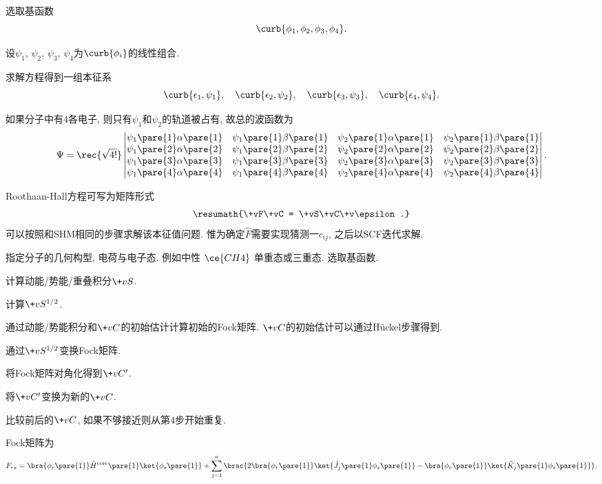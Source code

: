 \documentclass[hidelinks]{ctexart}
\begin{document}
\begin{cenum}
    \item 选取基函数
    \[ \curb{\phi_1,\phi_2,\phi_3,\phi_4}. \]
    \item 设$\psi_1$, $\psi_2$, $\psi_3$, $\psi_4$为$\curb{\phi_i}$的线性组合.
    \item 求解方程得到一组本征系
    \[ \curb{\epsilon_1,\psi_1},\quad \curb{\epsilon_2,\psi_2},\quad \curb{\epsilon_3,\psi_3},\quad \curb{\epsilon_4,\psi_4}. \]
    \item 如果分子中有$4$各电子, 则只有$\psi_1$和$\psi_2$的轨道被占有, 故总的波函数为
    \[ \Psi = \rec{\sqrt{4!}} \begin{vmatrix}
    \psi_1\pare{1}\alpha\pare{1} & \psi_1\pare{1}\beta\pare{1} & \psi_2\pare{1}\alpha\pare{1} & \psi_2\pare{1}\beta\pare{1} \\
    \psi_1\pare{2}\alpha\pare{2} & \psi_1\pare{2}\beta\pare{2} & \psi_2\pare{2}\alpha\pare{2} & \psi_2\pare{2}\beta\pare{2} \\
    \psi_1\pare{3}\alpha\pare{3} & \psi_1\pare{3}\beta\pare{3} & \psi_2\pare{3}\alpha\pare{3} & \psi_2\pare{3}\beta\pare{3} \\
    \psi_1\pare{4}\alpha\pare{4} & \psi_1\pare{4}\beta\pare{4} & \psi_2\pare{4}\alpha\pare{4} & \psi_2\pare{4}\beta\pare{4}
\end{vmatrix}. \]
\end{cenum}
Roothaan-Hall方程可写为矩阵形式
\[ \resumath{\+vF\+vC = \+vS\+vC\+v\epsilon.} \]
可以按照和SHM相同的步骤求解该本征值问题. 惟为确定$\hat F$需要实现猜测一$c_{ij}$, 之后以SCF迭代求解.
\begin{cenum}
    \item 指定分子的几何构型, 电荷与电子态. 例如中性 $\ce{CH4}$ 单重态或三重态. 选取基函数.
    \item 计算动能/势能/重叠积分$\+vS$.
    \item 计算$\+vS^{1/2}$.
    \item 通过动能/势能积分和$\+vC$的初始估计计算初始的Fock矩阵. $\+vC$的初始估计可以通过H\"uckel步骤得到.
    \item 通过$\+vS^{1/2}$变换Fock矩阵.
    \item 将Fock矩阵对角化得到$\+vC'$.
    \item 将$\+vC'$变换为新的$\+vC$.
    \item 比较前后的$\+vC$, 如果不够接近则从第$4$步开始重复.
\end{cenum}
Fock矩阵为
\[ F_{rs} = \bra{\phi_r\pare{1}}\hat H^{\mathrm{core}}\pare{1}\ket{\phi_s\pare{1}} + \sum_{j=1}^n \brac{2\bra{\phi_r\pare{1}}\ket{\hat J_j\pare{1}\phi_s\pare{1}} - \bra{\phi_r\pare{1}}\ket{\hat K_j\pare{1} \phi_s\pare{1}}}. \]
\end{document}
